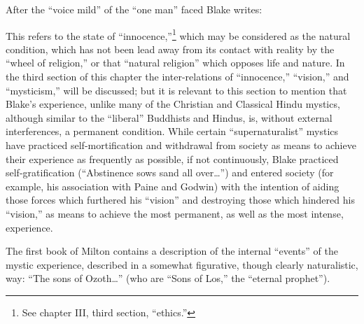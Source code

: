\label{self:11}


\noindent After the \enquote{voice mild} of the \enquote{one man} faced Blake writes:


This refers to the state of \enquote{innocence,}\footnote{See chapter III, third section, \enquote{ethics.}}
which may be considered as the natural condition, which has not been lead away from its contact
with reality by the \enquote{wheel of religion,} or that \enquote{natural religion} which
opposes life and nature. In the third section of this chapter the inter-relations
of \enquote{innocence,} \enquote{vision,} and \enquote{mysticism,} will be discussed; but it is relevant to
this section to mention that Blake's experience, unlike many of the Christian and Classical Hindu
mystics, although similar to the \enquote{liberal} Buddhists and Hindus, is, without external
interferences, a permanent condition. While certain \enquote{supernaturalist} mystics have practiced
self-mortification and withdrawal from society as means to achieve their experience as frequently
as possible, if not continuously, Blake practiced self-gratification (\enquote{Abstinence sows sand all over\dots})
and entered society (for example, his association with Paine and Godwin) with the intention
of aiding those forces which furthered his \enquote{vision} and destroying those which hindered his \enquote{vision,}
as means to achieve the most permanent, as well as the most intense, experience.

The first book of Milton contains a description of the internal \enquote{events} of the mystic experience,
described in a somewhat figurative, though clearly naturalistic, way: \enquote{The sons of Ozoth\dots} (who are \enquote{Sons of Los,}
the \enquote{eternal prophet}).

